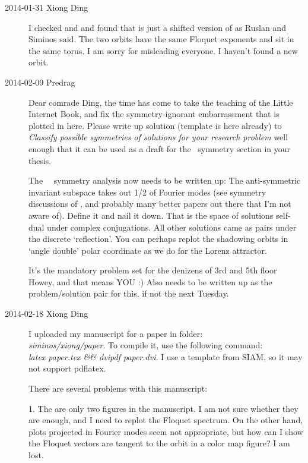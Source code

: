 \begin{description}
\item[2014-01-31 Xiong Ding] I checked  and  and
found that  is just a shifted version of  as
Ruslan and Siminos said. The two orbits have the same Floquet exponents and
sit in the same torus. I am sorry for misleading everyone. I haven't found
a new orbit.

\item[2014-02-09 Predrag]
Dear {comrade Ding}, the time has come to take the teaching of the
Little Internet Book, and fix the symmetry-ignorant
embarrassment that is plotted in
 {here}.
Please write up solution (template is here already) to
 {\em Classify possible symmetries of
solutions for your research problem} well enough that it can be used as a
draft for the \KS\ symmetry section in your thesis.

The \ \KS\ symmetry analysis now needs to be written up: The
anti-symmetric invariant subspace takes out 1/2 of Fourier modes (see
symmetry discussions of ,
and probably many better papers out there that I'm not aware of).
Define it and nail it down.
That is the space of solutions self-dual under complex conjugations. All
other solutions came as pairs under the discrete `reflection'. You can
perhaps replot the shadowing orbits in `angle double' polar coordinate
as we do for the Lorenz
attractor.

It's the mandatory problem set for the denizens of 3rd and 5th floor
Howey, and that means YOU :)  Also needs to be written up as the problem/solution
pair for this, if not the next Tuesday.

\item[2014-02-18 Xiong Ding]
I uploaded my manuscript for a paper in folder: \\
\emph{siminos/xiong/paper}. To compile it, use the following command:\\
\textit{latex paper.tex \&\& dvipdf paper.dvi}. I use a template from
SIAM, so it may not support pdflatex.

There are several problems with this manuscript:

1. The are only two figures in the manuscript. I am not sure whether
they are enough, and I need to replot the Floquet
spectrum. On the other hand, plots projected in Fourier modes seem
not appropriate, but how can I show the Floquet vectors are
tangent to the orbit in a color map figure? I am lost.


\end{description}
